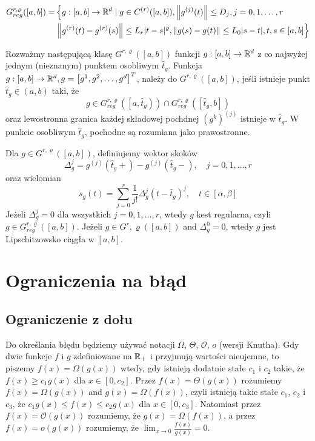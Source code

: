 \documentclass[oik, pdftex, robocza, man]{mgrwms}
\begin{document}
    \begin{equation*}
        \begin{aligned}
        G_{reg}^{r, \varrho}([a, b])= &\left\{g:[a, b] \rightarrow \mathbb{R}^{d} \mid g \in C^{(r)}([a, b]),\left\|g^{(j)}(t)\right\| \leq D_{j}, j=0,1, \ldots, r\right. \\
                                      &\left.\left\|g^{(r)}(t)-g^{(r)}(s)\right\| \leq L_{r}|t-s|^{\varrho},\|g(s)-g(t)\| \leq L_{0}|s-t|, t, s \in [a, b]\right\}
        \end{aligned}
    \end{equation*}

    Rozważmy następującą klasę $G^{r, \varrho}([a, b])$ funkcji $g:[a, b] \rightarrow \mathbb{R}^{d}$ z co najwyżej jednym (nieznanym) punktem osobliwym $\hat{t}_{g}$. Funkcja $g:[a, b] \rightarrow \mathbb{R}^{d}, g=\left[g^{1}, g^{2}, \ldots, g^{d}\right]^{T}$, należy do $G^{r, \varrho}([a, b])$, jeśli istnieje punkt $\hat{t}_{g} \in (a, b)$ taki, że 
    $$
    g \in G_{reg}^{r, \varrho}\left(\left[a, \hat{t}_{g}\right)\right) \cap G_{reg}^{r, \varrho}\left(\left[\hat{t}_{g}, b\right]\right)
    $$
    oraz lewostronna granica każdej składowej pochdnej $\left(g^{k}\right)^{(j)}$ istnieje w $\hat{t}_{g}$. W punkcie osobliwym $\hat{t}_{g}$, pochodne są rozumiana jako prawostronne.
    
    Dla $g \in G^{r, \varrho}([a, b])$, definiujemy wektor skoków
    $$
    \Delta_{g}^{j}=g^{(j)}\left(\hat{t}_{g}+\right)-g^{(j)}\left(\hat{t}_{g}-\right), \quad j=0,1, \ldots, r
    $$
    oraz wielomian
    $$
    s_{g}(t)=\sum_{j=0}^{r} \frac{1}{j !} \Delta_{g}^{j}\left(t-\hat{t}_{g}\right)^{j}, \quad t \in[\alpha, \beta]
    $$
    Jeżeli $\Delta_{g}^{j}=0$ dla wszystkich $j=0,1, \ldots, r$, wtedy $g$ kest regularna, czyli $g \in G_{reg}^{r, \varrho}([a, b])$. Jeżeli $g \in G^{r}, \varrho([a, b])$ and $\Delta_{g}^{0}=0$, wtedy $g$ jest Lipschitzowsko ciągła w $[a, b]$.


\mgrclosechapter


\chapter{Ograniczenia na błąd}


\section{Ograniczenie z dołu}


    Do określania błędu będziemy używać notacji $\varOmega$, $\varTheta$, $\mathcal{O}$, $\textit{o}$ (wersji Knutha). Gdy dwie funkcje $f$ i $g$ zdefiniowane na $\mathbb{R}_{+}$ i przyjmują wartości nieujemne, to piszemy $f(x) = \Omega\left( g(x) \right)$ wtedy, gdy istnieją dodatnie stałe $c_{1}$ i $c_{2}$ takie, że $f(x) \geq c_{1} g(x)$ dla $x \in [0, c_{2}]$. Przez $f(x) = \Theta\left( g(x) \right)$ rozumiemy $f(x) = \Omega\left( g(x) \right)$ and $g(x) = \Omega\left( f(x) \right)$, czyli istnieją takie stałe $c_{1}$, $c_{2}$ i $c_{3}$, że $c_{1} g(x) \leq f(x) \leq c_{2} g(x)$ dla $x \in [0, c_{3}]$. Natomiast przez $f(x) = \mathcal{O}(g(x))$ rozumiemy, że $g(x) = \Omega(f(x))$, a przez $f(x) = \textit{o}(g(x))$ rozumiemy, że $\displaystyle \lim_{x \rightarrow 0} \frac{f(x)}{g(x)} = 0$.
\end{document}
